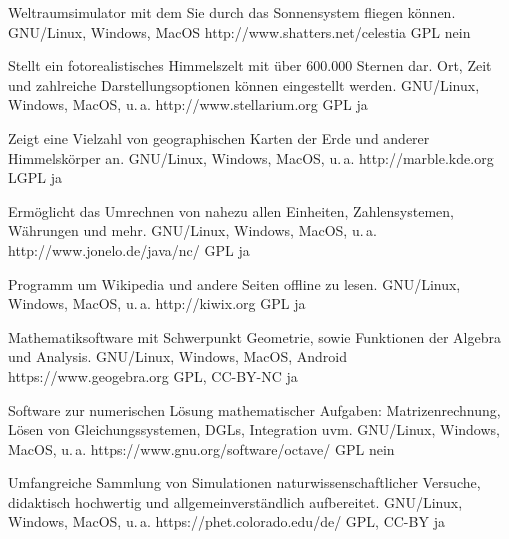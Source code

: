 




{Weltraumsimulator mit dem Sie durch das Sonnensystem fliegen können.}
{GNU/Linux, Windows, MacOS}
{http://www.shatters.net/celestia}
{GPL}
{nein}

{Stellt ein fotorealistisches Himmelszelt mit über 600.000 Sternen dar. Ort, Zeit und zahlreiche Darstellungsoptionen können eingestellt werden.}
{GNU/Linux, Windows, MacOS, u.\,a.}
{http://www.stellarium.org}
{GPL}
{ja}

{Zeigt eine Vielzahl von geographischen Karten der Erde und anderer Himmelskörper an.}
{GNU/Linux, Windows, MacOS, u.\,a.}
{http://marble.kde.org}
{LGPL}
{ja}

{Ermöglicht das Umrechnen von nahezu allen Einheiten, Zahlensystemen, Währungen und mehr.}
{GNU/Linux, Windows, MacOS, u.\,a.}
{http://www.jonelo.de/java/nc/}
{GPL}
{ja}

{Programm um Wikipedia und andere Seiten offline zu lesen.}
{GNU/Linux, Windows, MacOS, u.\,a.}
{http://kiwix.org}
{GPL}
{ja}

{Mathematiksoftware mit Schwerpunkt Geometrie, sowie Funktionen der Algebra und Analysis.}
{GNU/Linux, Windows, MacOS, Android}
{https://www.geogebra.org}
{GPL, CC-BY-NC}
{ja}

{Software zur numerischen Lösung mathematischer Aufgaben: Matrizenrechnung, Lösen von Gleichungssystemen, DGLs, Integration uvm.}
{GNU/Linux, Windows, MacOS, u.\,a.}
{https://www.gnu.org/software/octave/}
{GPL}
{nein}

{Umfangreiche Sammlung von Simulationen naturwissenschaftlicher Versuche, didaktisch hochwertig und allgemeinverständlich aufbereitet.}
{GNU/Linux, Windows, MacOS, u.\,a.}
{https://phet.colorado.edu/de/}
{GPL, CC-BY}
{ja}

\backpage


